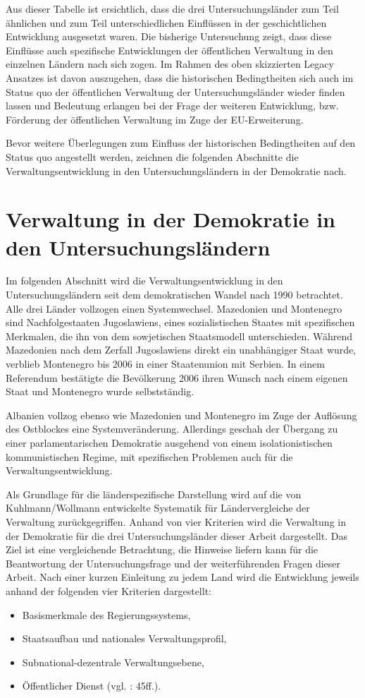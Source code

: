 Aus dieser Tabelle ist ersichtlich, dass die drei Untersuchungsländer zum Teil ähnlichen und zum Teil unterschiedlichen Einflüssen in der geschichtlichen Entwicklung ausgesetzt waren. Die bisherige Untersuchung zeigt, dass diese Einflüsse auch spezifische Entwicklungen der öffentlichen Verwaltung in den einzelnen Ländern nach sich zogen. Im Rahmen des oben skizzierten Legacy Ansatzes ist davon auszugehen, dass die historischen Bedingtheiten sich auch im Status quo der öffentlichen Verwaltung der Untersuchungsländer wieder finden lassen und Bedeutung erlangen bei der Frage der weiteren Entwicklung, bzw. Förderung der öffentlichen Verwaltung im Zuge der EU-Erweiterung.\par
Bevor weitere Überlegungen zum Einfluss der historischen Bedingtheiten auf den Status quo angestellt werden, zeichnen die folgenden Abschnitte die Verwaltungsentwicklung in den Untersuchungsländern in der Demokratie nach. 

\section{Verwaltung in der Demokratie in den Untersuchungsländern}
Im folgenden Abschnitt wird die Verwaltungsentwicklung in den Untersuchungsländern seit dem demokratischen Wandel nach 1990 betrachtet. Alle drei Länder vollzogen einen Systemwechsel. Mazedonien und Montenegro sind Nachfolgestaaten Jugoslawiens, eines sozialistischen Staates mit spezifischen Merkmalen, die ihn von dem sowjetischen Staatsmodell unterschieden. Während Mazedonien nach dem Zerfall Jugoslawiens direkt ein unabhängiger Staat wurde, verblieb Montenegro bis 2006 in einer Staatenunion mit Serbien. In einem Referendum bestätigte die Bevölkerung 2006 ihren Wunsch nach einem eigenen Staat und Montenegro wurde selbstständig.\par
Albanien vollzog ebenso wie Mazedonien und Montenegro im Zuge der Auflösung des Ostblockes eine Systemveränderung. Allerdings geschah der Übergang zu einer parlamentarischen Demokratie ausgehend von einem isolationistischen kommunistischen Regime, mit spezifischen Problemen auch für die Verwaltungsentwicklung.\par
Als Grundlage für die länderspezifische Darstellung wird auf die von Kuhlmann/Wollmann entwickelte Systematik für Ländervergleiche der Verwaltung zurückgegriffen. Anhand von vier Kriterien wird die Verwaltung in der Demokratie für die drei Untersuchungsländer dieser Arbeit dargestellt. Das Ziel ist eine vergleichende Betrachtung, die Hinweise liefern kann für die Beantwortung der Untersuchungsfrage und der weiterführenden Fragen dieser Arbeit. Nach einer kurzen Einleitung zu jedem Land wird die Entwicklung jeweils anhand der folgenden vier Kriterien dargestellt:
\begin{itemize} \itemsep1pt \parskip0pt 
\item Basismerkmale des Regierungssystems,
\item Staatsaufbau und nationales Verwaltungsprofil,
\item Subnational-dezentrale Verwaltungsebene,
\item Öffentlicher Dienst (vgl. \cite{kuhwol} : 45ff.).
\end{itemize}
